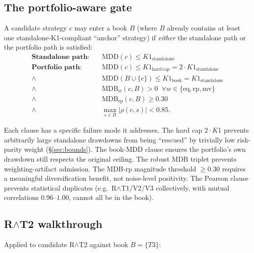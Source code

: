 \documentclass[11pt]{article}
\begin{document}
\subsection{The portfolio-aware gate}
\label{sec:gate}

A candidate strategy $c$ may enter a book $B$ (where $B$ already contains at
least one standalone-K1-compliant ``anchor'' strategy) if \emph{either} the
standalone path or the portfolio path is satisfied:
\begin{align}
\textbf{Standalone path:} \quad &\mathrm{MDD}(c) \leq K1_{\mathrm{standalone}} \\
\textbf{Portfolio path:} \quad &\mathrm{MDD}(c) \leq K1_{\mathrm{hard\,cap}}
                                  = 2 \cdot K1_{\mathrm{standalone}} \nonumber \\
                          \wedge\;\; &\mathrm{MDD}(B \cup \{c\}) \leq K1_{\mathrm{book}}
                                  = K1_{\mathrm{standalone}} \nonumber \\
                          \wedge\;\; &\mathrm{MDB}_w(c, B) > 0 \;\;\forall w \in \{\mathrm{eq}, \mathrm{rp}, \mathrm{mv}\} \nonumber \\
                          \wedge\;\; &\mathrm{MDB}_{\mathrm{rp}}(c, B) \geq 0.30 \nonumber \\
                          \wedge\;\; &\max_{s \in B} |\rho(c, s)| < 0.85.
\label{eq:gate}
\end{align}

Each clause has a specific failure mode it addresses. The hard cap
$2 \cdot K1$ prevents arbitrarily large standalone drawdowns from being
``rescued'' by trivially low risk-parity weight (\S\ref{sec:bounds}). The
book-MDD clause ensures the portfolio's own drawdown still respects the
original ceiling. The robust MDB triplet prevents weighting-artifact
admission. The MDB-rp magnitude threshold $\geq 0.30$ requires a meaningful
diversification benefit, not noise-level positivity. The Pearson clause
prevents statistical duplicates (e.g.\ R$\wedge$T1/V2/V3 collectively, with
mutual correlations $0.96\text{--}1.00$, cannot all be in the book).

\subsection{R\texorpdfstring{$\wedge$}{ }T2 walkthrough}

Applied to candidate R$\wedge$T2 against book $B = \{T3\}$:
\end{document}
